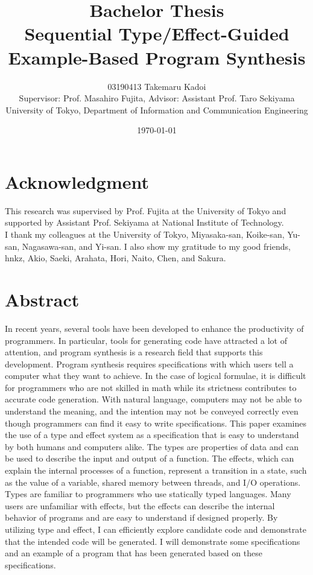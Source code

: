 \documentclass[12pt, a4paper, titlepage]{report}
\title{
  Bachelor Thesis \\
  Sequential Type/Effect-Guided Example-Based Program Synthesis
}
\author{
  03190413 Takemaru Kadoi
  \\[1cm]
  {\small Supervisor: Prof. Masahiro Fujita},
  {\small Advisor: Assistant Prof. Taro Sekiyama}
  \\[1cm]
  {\small University of Tokyo, Department of Information and Communication Engineering}
}
\date{\today}
\begin{document}


\maketitle
\newpage
\tableofcontents
\newpage

\chapter*{Acknowledgment}
This research was supervised by Prof. Fujita at the University of Tokyo and supported by Assistant Prof. Sekiyama at National Institute of Technology. \\
I thank my colleagues at the University of Tokyo, Miyasaka-san, Koike-san, Yu-san, Nagasawa-san, and Yi-san.
I also show my gratitude to my good friends, hnkz, Akio, Saeki, Arahata, Hori, Naito, Chen, and Sakura.

\chapter{Abstract} \label{chapter:abstract}
In recent years, several tools have been developed to enhance the productivity of programmers.
In particular, tools for generating code have attracted a lot of attention, and program synthesis is a research field that supports this development.
Program synthesis requires specifications with which users tell a computer what they want to achieve.
In the case of logical formulae, it is
difficult for programmers who are not skilled in math while its strictness contributes to accurate code generation.
With natural language, computers may not be able to understand the meaning, and the intention may not be conveyed correctly even though programmers can find it easy to write specifications.
This paper examines the use of a type and effect system as a specification that is easy to understand by both humans and computers alike. The types are properties of data and can be used to describe the input and output of a function. The effects, which can explain the internal processes of a function, represent a transition in a state, such as the value of a variable, shared memory between threads, and I/O operations.
Types are familiar to programmers who use statically typed languages.
Many users are unfamiliar with effects, but the effects can describe the internal behavior of programs and are easy to understand if designed properly.
By utilizing type and effect, I can efficiently explore candidate code and demonstrate that the intended code will be generated. I will demonstrate some specifications and an example of a program that has been generated based on these specifications.
 
\end{document}
